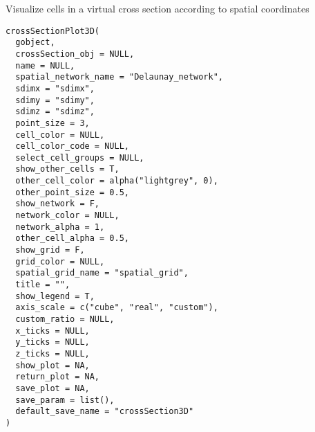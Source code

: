 \documentclass[a4paper]{book}
\begin{document}
%
\begin{Description}\relax
Visualize cells in a virtual cross section according to spatial coordinates
\end{Description}
%
\begin{Usage}
\begin{verbatim}
crossSectionPlot3D(
  gobject,
  crossSection_obj = NULL,
  name = NULL,
  spatial_network_name = "Delaunay_network",
  sdimx = "sdimx",
  sdimy = "sdimy",
  sdimz = "sdimz",
  point_size = 3,
  cell_color = NULL,
  cell_color_code = NULL,
  select_cell_groups = NULL,
  show_other_cells = T,
  other_cell_color = alpha("lightgrey", 0),
  other_point_size = 0.5,
  show_network = F,
  network_color = NULL,
  network_alpha = 1,
  other_cell_alpha = 0.5,
  show_grid = F,
  grid_color = NULL,
  spatial_grid_name = "spatial_grid",
  title = "",
  show_legend = T,
  axis_scale = c("cube", "real", "custom"),
  custom_ratio = NULL,
  x_ticks = NULL,
  y_ticks = NULL,
  z_ticks = NULL,
  show_plot = NA,
  return_plot = NA,
  save_plot = NA,
  save_param = list(),
  default_save_name = "crossSection3D"
)
\end{verbatim}
\end{Usage}
%
\end{document}

